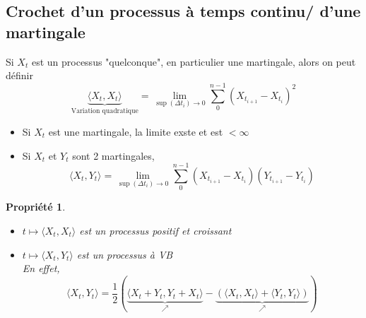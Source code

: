 \documentclass{report}
\newtheorem{prop}{Propri\'et\'e}
\newenvironment{encadre}{%
  \setlength{\theorempreskipamount}{0pt}%
  \setlength{\theorempostskipamount}{0pt}%
  \begin{framed}%
 }{%
  \vspace{-2pt}%
  \end{framed}%
 }
\begin{document}
\vspace{0.4cm}


\subsection{Crochet d'un processus à temps continu/ d'une martingale}

Si $X_t$ est un processus "quelconque", en particulier une martingale, alors on peut définir\[\underbrace{\langle X_t, X_t\rangle}_{\mbox{Variation quadratique}} = \displaystyle\lim_{\sup(\Delta t_i)\to 0} \displaystyle\sum_0^{n-1}(X_{t_{i+1}}-X_{t_i})^2\]
\begin{itemize}
    \item Si $X_t$ est une martingale, la limite exste et est $<\infty$
    \item Si $X_t$ et $Y_t$ sont 2 martingales, \[\langle X_t, Y_t\rangle = \displaystyle\lim_{\sup(\Delta t_i)\to 0} \displaystyle\sum_0^{n-1}(X_{t_{i+1}}-X_{t_i})(Y_{t_{i+1}}-Y_{t_i})\]
\end{itemize}

\begin{encadre}
\begin{prop}$\ $
\begin{itemize}
    \item $t\mapsto \langle X_t, X_t\rangle$ est un processus positif et croissant
    \item $t\mapsto \langle X_t, Y_t\rangle$ est un processus à VB\\
    En effet, \[\langle X_t, Y_t\rangle = \displaystyle\frac{1}{2}\left(\underbrace{\langle X_t+Y_t, Y_t+X_t\rangle}_\nearrow-\underbrace{(\langle X_t, X_t\rangle+\langle Y_t, Y_t\rangle)}_\nearrow\right)\]
\end{itemize}
\end{prop}
\end{encadre}
\end{document}
